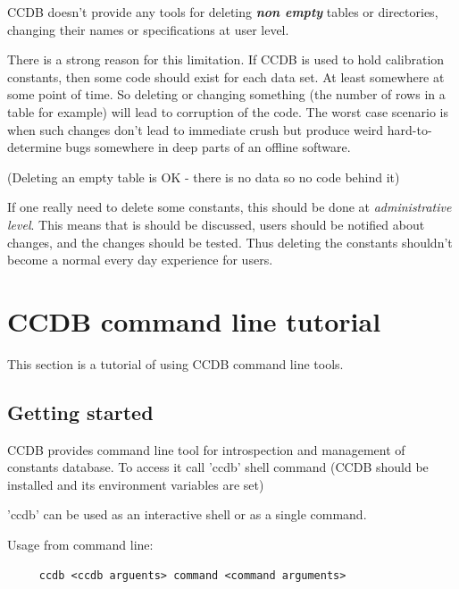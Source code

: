 \documentclass{article}
\begin{document}
CCDB doesn't provide any tools for deleting \textbf{\textit{non empty}} tables
or directories, changing their names or specifications at user level.

There is a strong reason for this limitation.
If CCDB is used to hold calibration constants, then some code should exist for
each data set. At least somewhere at some point of time. So deleting
or changing something (the number of rows in a table for example) will lead to
corruption of the code. The worst case scenario is when such changes don't
lead to immediate crush but produce weird hard-to-determine bugs somewhere in
deep parts of an offline software.

(Deleting an empty table is OK - there is no data so no code behind it)


If one really need to delete some constants, this should be done at
\textit{administrative level}. This means that is should be discussed, users
should be notified about changes, and the changes should be tested.
Thus deleting the constants shouldn't become a normal every day experience
for users.

\newpage
\section{CCDB command line tutorial}\label{sec:console_tools_tutorial}

This section is a tutorial of using CCDB command line tools.


\subsection {Getting started}

CCDB provides command line tool for introspection and management of constants
database. To access it call 'ccdb' shell command (CCDB should be installed and 
its environment variables are set)

'ccdb' can be used as an interactive shell or as a single command.
\vspace{1 em}


Usage from command line:
\begin{verbatim}
     ccdb <ccdb arguents> command <command arguments>
\end{verbatim}
\vspace{1 em}
\end{document}
